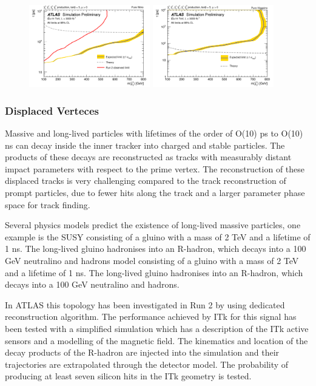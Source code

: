 \begin{figure}[hbtp]\begin{center}
\includegraphics[width=0.47\textwidth]{figures/ch03_fig_040a.png}
\includegraphics[width=0.47\textwidth]{figures/ch03_fig_040b.png}
\caption{ }
\label{fig:ATLAS_DT2}
\end{center}
\end{figure}


\subsubsection{Displaced Verteces} 

Massive and long-lived particles with lifetimes of the order of O(10) ps to O(10) ns can decay inside
the inner tracker into charged and stable particles. 
The products of these decays are reconstructed as tracks with measurably distant impact parameters with respect to the prime vertex.
The reconstruction of these displaced tracks is very challenging compared to the track reconstruction of prompt particles, due to fewer hits along the track and
a larger parameter phase space for track finding.

Several physics models predict the existence of long-lived massive particles, one example is the SUSY consisting of a gluino with a mass of 2 TeV and a
lifetime of 1 ns. The long-lived gluino hadronises into an R-hadron, which decays into a
100 GeV neutralino and hadrons model consisting of a gluino with a mass of 2 TeV and a
lifetime of 1 ns. The long-lived gluino hadronises into an R-hadron, which decays into a
100 GeV neutralino and hadrons.

 In ATLAS this topology has been investigated in Run 2 by using dedicated reconstruction algorithm.
The performance achieved by ITk for this signal has been tested  with
a simplified simulation which has a description of the ITk active sensors and a modelling
of the magnetic field. 
The kinematics and location of the decay products of the R-hadron
are injected into the simulation and their trajectories are extrapolated through the detector model. 
The probability of producing at least seven silicon hits in the ITk geometry is tested. 


